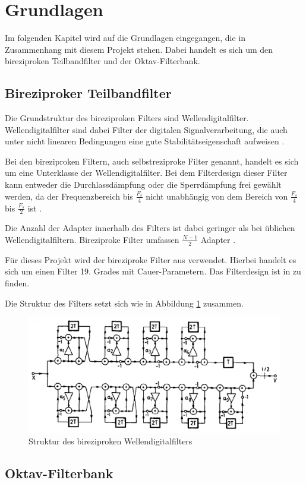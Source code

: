 %

\section{Grundlagen}
Im folgenden Kapitel wird auf die Grundlagen eingegangen, die in Zusammenhang mit diesem Projekt stehen. Dabei handelt es sich um den bireziproken Teilbandfilter und der Oktav-Filterbank.

\subsection{Bireziproker Teilbandfilter}
Die Grundstruktur des bireziproken Filters sind Wellendigitalfilter. Wellendigitalfilter sind dabei Filter der digitalen Signalverarbeitung, die auch unter nicht linearen Bedingungen eine gute Stabilitätseigenschaft aufweisen \cite[vgl.][S. 68]{gaszi1983}.\par
Bei den bireziproken Filtern, auch selbstreziproke Filter genannt, handelt es sich um eine Unterklasse der Wellendigitalfilter. Bei dem Filterdesign dieser Filter kann entweder die Durchlassdämpfung oder die Sperrdämpfung frei gewählt werden, da der Frequenzbereich bis $\frac{F_s}{4}$ nicht unabhängig von dem Bereich von $\frac{F_s}{4}$ bis $\frac{F_s}{2}$ ist \cite[vgl.][S. 72]{gaszi1983}.\par
Die Anzahl der Adapter innerhalb des Filters ist dabei geringer als bei üblichen Wellendigitalfiltern. Bireziproke Filter umfassen $\frac{N - 1}{2}$ Adapter \cite[vgl.][S. 73]{gaszi1983}.\par
Für dieses Projekt wird der bireziproke Filter aus \cite{gaszi1983} verwendet. Hierbei handelt es sich um einen Filter 19. Grades mit Cauer-Parametern. Das Filterdesign ist in \cite[][S. 74]{gaszi1983} zu finden.\par
Die Struktur des Filters setzt sich wie in Abbildung \ref{fig:bireziprok_Struktur} zusammen.
\begin{figure}[h!]
	\centering	\includegraphics[width=15cm]{img/BireziprokerFilter.png}
	\caption{Struktur des bireziproken Wellendigitalfilters}
	\label{fig:bireziprok_Struktur}
\end{figure}

\subsection{Oktav-Filterbank}
